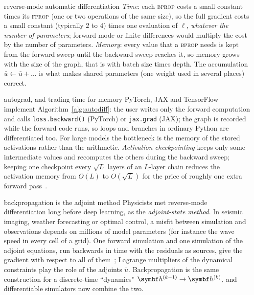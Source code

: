 \documentclass[11pt]{article}
\newcommand{\hv}{\vect{h}}
\begin{document}
\begin{runtime}{reverse-mode automatic differentiation}
\emph{Time}: each \textsc{bprop} costs a small constant times its \textsc{fprop} (one or two operations of the same
size), so the full gradient costs a small constant (typically 2 to 4) times one evaluation of $\ell$, \emph{whatever
the number of parameters}; forward mode or finite differences would multiply the cost by the number of parameters.
\emph{Memory}: every value that a \textsc{bprop} needs is kept from the forward sweep until the backward sweep reaches
it, so memory grows with the size of the graph, that is with batch size times depth. The accumulation $\bar{u} \gets \bar{u} + \dots$ is
what makes shared parameters (one weight used in several places) correct.
\end{runtime}

\begin{modern}{autograd, and trading time for memory}
PyTorch, JAX and TensorFlow implement Algorithm~\ref{alg:autodiff}: the user writes only the forward computation and
calls \texttt{loss.backward()} (PyTorch) or \texttt{jax.grad} (JAX); the graph is recorded while the forward code runs,
so loops and branches in ordinary Python are differentiated too. For large models the bottleneck is the memory of the
stored activations rather than the arithmetic. \emph{Activation checkpointing} keeps only some intermediate values
and recomputes the others during the backward sweep; keeping one checkpoint every $\sqrt L$ layers of an $L$-layer chain
reduces the activation memory from $O(L)$ to $O(\sqrt L)$ for the price of roughly one extra forward
pass~\cite{chen2016}.
\end{modern}

\begin{physics}{backpropagation is the adjoint method}
Physicists met reverse-mode differentiation long before deep learning, as the \emph{adjoint-state method}. In seismic
imaging, weather forecasting or optimal control, a misfit between simulation and observations depends on millions of
model parameters (for instance the wave speed in every cell of a grid). One forward simulation and one simulation of
the adjoint equations, run backwards in time with the residuals as sources, give the gradient with respect to all of
them~\cite{plessix2006}; Lagrange multipliers of the dynamical constraints play the role of the adjoints $\bar{u}$.
Backpropagation is the same construction for a discrete-time ``dynamics'' $\hv^{(k-1)} \to \hv^{(k)}$, and
differentiable simulators now combine the two.
\end{physics}
\end{document}
